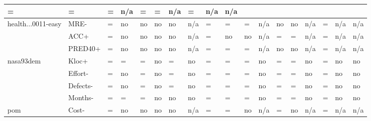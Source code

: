 \begin{tabular}{llllllllllllllllll}
                                        = & = & = & n/a & 
                                        = & = & n/a & 
                                        = & n/a & 
                                        n/a  \\
  \hline
  health...0011-easy     & MRE-       & = & no & no & no & no & n/a & 
                                        = & = & = & n/a & 
                                        no & no & n/a & 
                                        = & n/a & 
                                        n/a  \\
                         & ACC+       & = & no & no & no & no & n/a & 
                                        = & no & no & n/a & 
                                        = & = & n/a & 
                                        = & n/a & 
                                        n/a  \\
                         & PRED40+    & = & no & no & no & no & n/a & 
                                        = & = & = & n/a & 
                                        no & no & n/a & 
                                        = & n/a & 
                                        n/a  \\
  \hline
  nasa93dem   & Kloc+         & = & = & = & no & = & no & 
                                = & = & = & no & 
                                = & = & no & 
                                = & no & 
                                no  \\
              & Effort-       & = & no & = & no & = & no & 
                                = & = & = & no & 
                                = & = & no & 
                                = & no & 
                                no  \\
              & Defects-      & = & no & = & no & = & no & 
                                = & = & = & no & 
                                = & = & no & 
                                = & no & 
                                no  \\
              & Months-       & = & = & = & no & no & no & 
                                = & = & = & no & 
                                = & = & no & 
                                = & no & 
                                no  \\
  \hline
  pom   & Cost-             & = & no & no & no & no & n/a & 
                              = & = & no & n/a & 
                              = & no & n/a & 
                              = & n/a & 
                              n/a  \\

\end{tabular}
